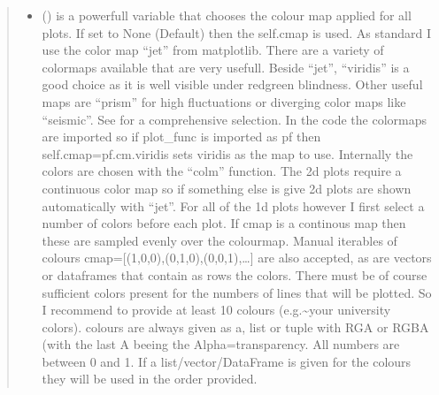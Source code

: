 \documentclass[letterpaper,10pt,english]{sphinxmanual}
\begin{document}
\begin{fulllineitems}
\begin{quote}
\begin{description}
\begin{itemize}
\item {} 
 (\sphinxstyleliteralemphasis{\sphinxupquote{, }}) \textendash{} is a powerfull variable that chooses the colour map applied for all plots. If set to
None (Default) then the self.cmap is used.
As standard I use the color map “jet” from matplotlib. There are a variety of colormaps
available that are very usefull. Beside “jet”, “viridis” is a good choice as it is well
visible under red\sphinxhyphen{}green blindness. Other useful maps are “prism” for high fluctuations
or diverging color maps like “seismic”.
See  for a comprehensive
selection. In the code the colormaps are imported so if plot\_func is imported as pf then
self.cmap=pf.cm.viridis sets viridis as the map to use. Internally the colors are chosen
with the “colm” function. The 2d plots require a continuous color map so if something
else is give 2d plots are shown automatically with “jet”. For all of the 1d plots however
I first select a number of colors before each plot. If cmap is a continous map then these
are sampled evenly over the colourmap. Manual iterables of colours
cmap={[}(1,0,0),(0,1,0),(0,0,1),…{]} are also accepted, as are vectors or dataframes that
contain as rows the colors. There must be of course sufficient colors present for
the numbers of lines that will be plotted. So I recommend to provide at least 10 colours
(e.g.\textasciitilde{}your university colors). colours are always given as a, list or tuple with RGA or RGBA
(with the last A beeing the Alpha=transparency. All numbers are between 0 and 1.
If a list/vector/DataFrame is given for the colours they will be used in the order provided.

\end{itemize}

\end{description}\end{quote}

\end{fulllineitems}

\end{document}
